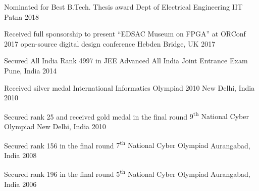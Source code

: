 
\begin{cvhonors}

\cvhonor
	{Nominated for Best B.Tech. Thesis award} %
	{Dept of Electrical Engineering} %
	{IIT Patna} %
	{2018} %

\cvhonor
	{Received full sponsorship to present ``EDSAC Museum on FPGA'' at ORConf 2017 open-source digital design conference} %
	{} %
	{Hebden Bridge, UK} %
	{2017} %

\cvhonor
	{Secured All India Rank 4997 in JEE Advanced} %
	{All India Joint Entrance Exam} %
	{Pune, India} %
	{2014} %

\cvhonor
	{Received silver medal} %
	{International Informatics Olympiad 2010} %
	{New Delhi, India} %
	{2010} %

\cvhonor
	{Secured rank 25 and received gold medal in the final round} %
	{9\textsuperscript{th} National Cyber Olympiad} %
	{New Delhi, India} %
	{2010} %

\cvhonor
	{Secured rank 156 in the final round} %
	{7\textsuperscript{th} National Cyber Olympiad} %
	{Aurangabad, India} %
	{2008} %

\cvhonor
	{Secured rank 196 in the final round} %
	{5\textsuperscript{th} National Cyber Olympiad} %
	{Aurangabad, India} %
	{2006} %

\end{cvhonors}
